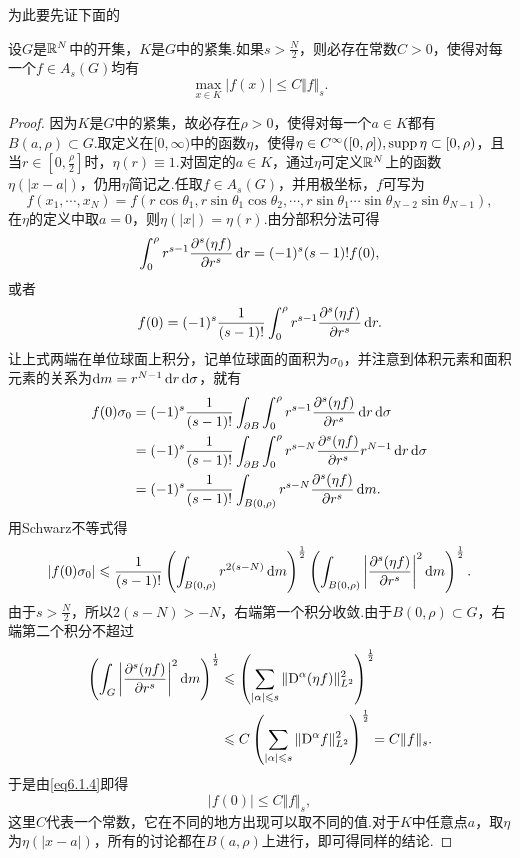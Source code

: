 为此要先证下面的
\begin{lemma}\label{lem6.1.8}
	设$G$是$\mathbb R^N$中的开集，$K$是$G$中的紧集.如果$s>\frac N2$，则必存在常数$C>0$，使得对每一个$f\in A_s(G)$均有
	\[\max_{x\in K}|f(x)|\le C\Vert f\Vert_s.\]
\end{lemma}
\begin{proof}
	因为$K$是$G$中的紧集，故必存在$\rho>0$，使得对每一个$a\in K$都有$B(a,\rho)\subset G$.取定义在$[0,\infty)$中的函数$\eta$，使得$\eta\in C^\infty([0,\rho]),\operatorname{supp}\eta\subset[0,\rho)$，且当$r\in\left[0,\frac{\rho}{2}\right]$时，$\eta(r)\equiv1$.对固定的$a\in K$，通过$\eta$可定义$\mathbb R^N$上的函数$\eta(|x-a|)$，仍用$\eta$简记之.任取$f\in A_s(G)$，并用极坐标，$f$可写为
	\[f(x_1,\cdots,x_N)=f(r\cos\theta_1,r\sin\theta_1\cos\theta_2,\cdots,r\sin\theta_1\cdots\sin\theta_{N-2}\sin\theta_{N-1}),\]
	在$\eta$的定义中取$a=0$，则$\eta(|x|)=\eta(r)$.由分部积分法可得
	\[\int_{0}^{\rho}r^{s-1}\frac{\partial^s(\eta f)}{\partial r^s}\mathop{}\!\mathrm{d} r=(-1)^s (s-1)! f(0),\]
	或者
	\[f(0)=(-1)^s\frac1{(s-1)!}\int_{0}^{\rho}r^{s-1}\frac{\partial^s(\eta f)}{\partial r^s}\mathop{}\!\mathrm{d} r.\]
	让上式两端在单位球面上积分，记单位球面的面积为$\sigma_0$，并注意到体积元素和面积元素的关系为$\mathop{}\!\mathrm{d} m=r^{N-1}\mathop{}\!\mathrm{d} r\mathop{}\!\mathrm{d}\sigma$，就有
	\begin{align*}
		f(0)\sigma_0
		&=(-1)^s\frac1{(s-1)!}\int_{\partial B}\int_{0}^{\rho}r^{s-1}\frac{\partial^s(\eta f)}{\partial r^s}\mathop{}\!\mathrm{d} r\mathop{}\!\mathrm{d}\sigma\\
		&=(-1)^s\frac1{(s-1)!}\int_{\partial B}\int_{0}^{\rho}r^{s-N}\frac{\partial^s(\eta f)}{\partial r^s}r^{N-1}\mathop{}\!\mathrm{d} r\mathop{}\!\mathrm{d}\sigma\\
		&=(-1)^s\frac1{(s-1)!}\int_{B(0,\rho)}r^{s-N}\frac{\partial^s(\eta f)}{\partial r^s}\mathop{}\!\mathrm{d} m.
	\end{align*}
用Schwarz不等式得
\begin{equation}\label{eq6.1.4}
	|f(0)\sigma_0|\leqslant\frac1{(s-1)!}\left(\int_{B(0,\rho)}r^{2(s-N)}\mathop{}\!\mathrm{d} m\right)^{\frac12}\left(\int_{B(0,\rho)}\left|\frac{\partial^s(\eta f)}{\partial r^s}\right|^2\mathop{}\!\mathrm{d} m\right)^{\frac12}.
\end{equation}
由于$s>\frac N2$，所以$2(s-N)>-N$，右端第一个积分收敛.由于$B(0,\rho)\subset G$，右端第二个积分不超过
\begin{align*}
	\left(\int_G \left|\frac{\partial^s(\eta f)}{\partial r^s}\right|^2\mathop{}\!\mathrm{d} m\right)^{\frac12}
	&\leqslant\left(\sum_{|\alpha|\leqslant s}\Vert\mathrm D^\alpha(\eta f)\Vert_{L^2}^2\right)^{\frac12}\\
	&\leqslant C\left(\sum_{|\alpha|\leqslant s}\Vert\mathrm D^\alpha f\Vert_{L^2}^2\right)^{\frac12}=C\Vert f\Vert_s.
\end{align*}
于是由\eqref{eq6.1.4}即得
\[|f(0)|\le C\Vert f\Vert_s,\]
这里$C$代表一个常数，它在不同的地方出现可以取不同的值.对于$K$中任意点$a$，取$\eta$为$\eta(|x-a|)$，所有的讨论都在$B(a,\rho)$上进行，即可得同样的结论.
\end{proof}
